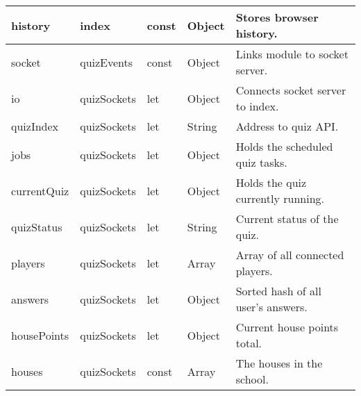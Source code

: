 \begin{table}[]
\begin{tabular}{|l|l|l|l|l|}
history                             & index                                & const                              & Object                               & Stores browser history.               \\ \hline
socket                              & quizEvents                           & const                              & Object                               & Links module to socket server.        \\ \hline
io                                  & quizSockets                          & let                                & Object                               & Connects socket server to index.      \\ \hline
quizIndex                           & quizSockets                          & let                                & String                               & Address to quiz API.                  \\ \hline
jobs                                & quizSockets                          & let                                & Object                               & Holds the scheduled quiz tasks.       \\ \hline
currentQuiz                         & quizSockets                          & let                                & Object                               & Holds the quiz currently running.     \\ \hline
quizStatus                          & quizSockets                          & let                                & String                               & Current status of the quiz.           \\ \hline
players                             & quizSockets                          & let                                & Array                                & Array of all connected players.       \\ \hline
answers                             & quizSockets                          & let                                & Object                               & Sorted hash of all user's answers.    \\ \hline
housePoints                         & quizSockets                          & let                                & Object                               & Current house points total.           \\ \hline
houses                              & quizSockets                          & const                              & Array                                & The houses in the school.             \\ \hline

\end{tabular}
\end{table}
